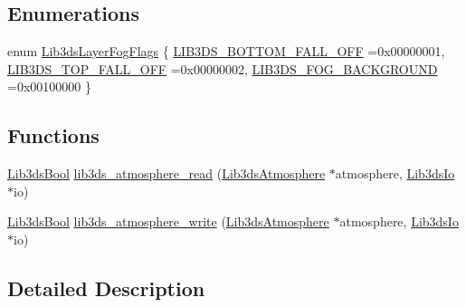 \subsection*{Enumerations}
\begin{DoxyCompactItemize}
\item 
enum \hyperlink{group__atmosphere_ga97509972c1ecfa3be722d20913a7ecea}{Lib3ds\-Layer\-Fog\-Flags} \{ \hyperlink{group__atmosphere_gga97509972c1ecfa3be722d20913a7eceaa1b7db965fba433f97074cc144eebdfde}{L\-I\-B3\-D\-S\-\_\-\-B\-O\-T\-T\-O\-M\-\_\-\-F\-A\-L\-L\-\_\-\-O\-F\-F} =0x00000001, 
\hyperlink{group__atmosphere_gga97509972c1ecfa3be722d20913a7eceaaf0b58092a4e8efa5780f957885948ec7}{L\-I\-B3\-D\-S\-\_\-\-T\-O\-P\-\_\-\-F\-A\-L\-L\-\_\-\-O\-F\-F} =0x00000002, 
\hyperlink{group__atmosphere_gga97509972c1ecfa3be722d20913a7eceaa9632efda063f1ee5ea861e65fd34fedf}{L\-I\-B3\-D\-S\-\_\-\-F\-O\-G\-\_\-\-B\-A\-C\-K\-G\-R\-O\-U\-N\-D} =0x00100000
 \}
\end{DoxyCompactItemize}
\subsection*{Functions}
\begin{DoxyCompactItemize}
\item 
\hyperlink{types_8h_a89dd7398a9ebbbf28011f8c32df67ad3}{Lib3ds\-Bool} \hyperlink{group__atmosphere_ga6e9049a5eaae091389745cdf74e45651}{lib3ds\-\_\-atmosphere\-\_\-read} (\hyperlink{struct_lib3ds_atmosphere}{Lib3ds\-Atmosphere} $\ast$atmosphere, \hyperlink{struct_lib3ds_io}{Lib3ds\-Io} $\ast$io)
\item 
\hyperlink{types_8h_a89dd7398a9ebbbf28011f8c32df67ad3}{Lib3ds\-Bool} \hyperlink{group__atmosphere_gac3e92fd2faa9b159c1acb474a55c57f7}{lib3ds\-\_\-atmosphere\-\_\-write} (\hyperlink{struct_lib3ds_atmosphere}{Lib3ds\-Atmosphere} $\ast$atmosphere, \hyperlink{struct_lib3ds_io}{Lib3ds\-Io} $\ast$io)
\end{DoxyCompactItemize}


\subsection{Detailed Description}


